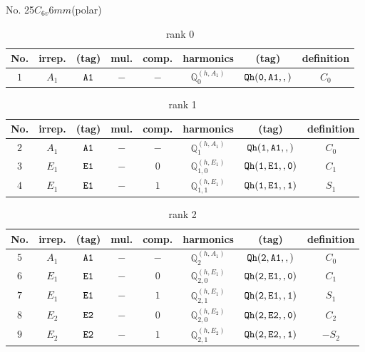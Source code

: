 \documentclass[fleqn,8pt]{jsarticle}
\begin{document}
\setcounter{MaxMatrixCols}{16}

\begin{center}
\LARGE
No. 25\quad$C_{6v}$\quad$6mm$\quad[ hexagonal ] (polar)
\end{center}
\begin{table}[ht!]
\begin{center}
\caption{rank 0}
\renewcommand{\arraystretch}{1.3}
\begin{tabular}{cccccccc} \hline \hline
No. & irrep. & (tag) & mul. & comp. & harmonics & (tag) & definition \\ \hline
$ 1 $ & $ A_{1} $ & $ {\tt A1} $ & $ - $ & $ - $ & $ \mathbb{Q}_{0}^{(h,A_{1})} $ & $ {\tt Qh(0,A1,,)} $ & $ C_{0} $ \\
 \hline \hline
\end{tabular}
\end{center}
\end{table}
\begin{table}[ht!]
\begin{center}
\caption{rank 1}
\renewcommand{\arraystretch}{1.3}
\begin{tabular}{cccccccc} \hline \hline
No. & irrep. & (tag) & mul. & comp. & harmonics & (tag) & definition \\ \hline
$ 2 $ & $ A_{1} $ & $ {\tt A1} $ & $ - $ & $ - $ & $ \mathbb{Q}_{1}^{(h,A_{1})} $ & $ {\tt Qh(1,A1,,)} $ & $ C_{0} $ \\
$ 3 $ & $ E_{1} $ & $ {\tt E1} $ & $ - $ & $ 0 $ & $ \mathbb{Q}_{1,0}^{(h,E_{1})} $ & $ {\tt Qh(1,E1,,0)} $ & $ C_{1} $ \\
$ 4 $ & $ E_{1} $ & $ {\tt E1} $ & $ - $ & $ 1 $ & $ \mathbb{Q}_{1,1}^{(h,E_{1})} $ & $ {\tt Qh(1,E1,,1)} $ & $ S_{1} $ \\
 \hline \hline
\end{tabular}
\end{center}
\end{table}
\begin{table}[ht!]
\begin{center}
\caption{rank 2}
\renewcommand{\arraystretch}{1.3}
\begin{tabular}{cccccccc} \hline \hline
No. & irrep. & (tag) & mul. & comp. & harmonics & (tag) & definition \\ \hline
$ 5 $ & $ A_{1} $ & $ {\tt A1} $ & $ - $ & $ - $ & $ \mathbb{Q}_{2}^{(h,A_{1})} $ & $ {\tt Qh(2,A1,,)} $ & $ C_{0} $ \\
$ 6 $ & $ E_{1} $ & $ {\tt E1} $ & $ - $ & $ 0 $ & $ \mathbb{Q}_{2,0}^{(h,E_{1})} $ & $ {\tt Qh(2,E1,,0)} $ & $ C_{1} $ \\
$ 7 $ & $ E_{1} $ & $ {\tt E1} $ & $ - $ & $ 1 $ & $ \mathbb{Q}_{2,1}^{(h,E_{1})} $ & $ {\tt Qh(2,E1,,1)} $ & $ S_{1} $ \\
$ 8 $ & $ E_{2} $ & $ {\tt E2} $ & $ - $ & $ 0 $ & $ \mathbb{Q}_{2,0}^{(h,E_{2})} $ & $ {\tt Qh(2,E2,,0)} $ & $ C_{2} $ \\
$ 9 $ & $ E_{2} $ & $ {\tt E2} $ & $ - $ & $ 1 $ & $ \mathbb{Q}_{2,1}^{(h,E_{2})} $ & $ {\tt Qh(2,E2,,1)} $ & $ - S_{2} $ \\
 \hline \hline
\end{tabular}
\end{center}
\end{table}
\end{document}

